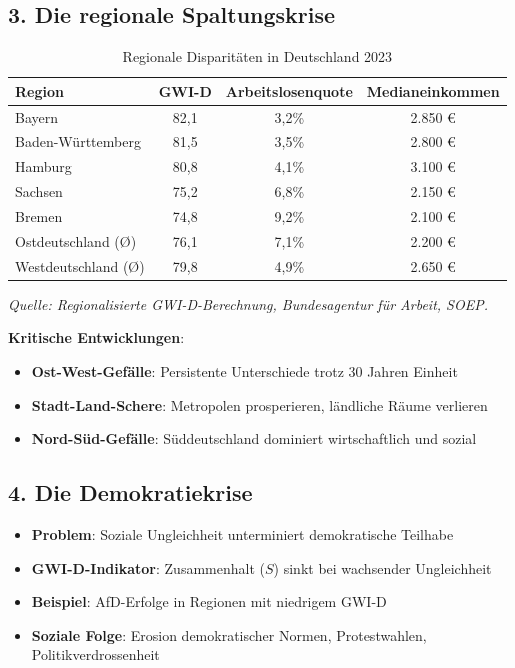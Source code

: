 \subsection{3. Die regionale Spaltungskrise}

\begin{table}[ht]
    \centering
    \caption{Regionale Disparitäten in Deutschland 2023}
    \label{tab:regionale_disparitaeten}
    \begin{tabular}{lccc}
        \toprule
        \textbf{Region} & \textbf{GWI-D} & \textbf{Arbeitslosenquote} & \textbf{Medianeinkommen} \\
        \midrule
        Bayern & 82,1 & 3,2\% & 2.850 € \\
        Baden-Württemberg & 81,5 & 3,5\% & 2.800 € \\
        Hamburg & 80,8 & 4,1\% & 3.100 € \\
        Sachsen & 75,2 & 6,8\% & 2.150 € \\
        Bremen & 74,8 & 9,2\% & 2.100 € \\
        Ostdeutschland (Ø) & 76,1 & 7,1\% & 2.200 € \\
        Westdeutschland (Ø) & 79,8 & 4,9\% & 2.650 € \\
        \bottomrule
    \end{tabular}
\end{table}

\begin{flushleft}
\footnotesize{\textit{Quelle: Regionalisierte GWI-D-Berechnung, Bundesagentur für Arbeit, SOEP.}}
\end{flushleft}

\textbf{Kritische Entwicklungen}:
\begin{itemize}
    \item \textbf{Ost-West-Gefälle}: Persistente Unterschiede trotz 30 Jahren Einheit
    \item \textbf{Stadt-Land-Schere}: Metropolen prosperieren, ländliche Räume verlieren
    \item \textbf{Nord-Süd-Gefälle}: Süddeutschland dominiert wirtschaftlich und sozial
\end{itemize}

\subsection{4. Die Demokratiekrise}

\begin{itemize}
    \item \textbf{Problem}: Soziale Ungleichheit unterminiert demokratische Teilhabe
    \item \textbf{GWI-D-Indikator}: Zusammenhalt (\(S\)) sinkt bei wachsender Ungleichheit
    \item \textbf{Beispiel}: AfD-Erfolge in Regionen mit niedrigem GWI-D
    \item \textbf{Soziale Folge}: Erosion demokratischer Normen, Protestwahlen, Politikverdrossenheit
\end{itemize}

